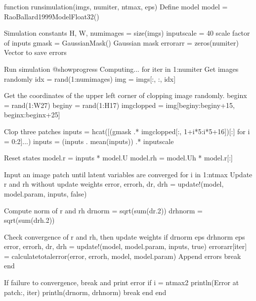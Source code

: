\documentclass[letterpaper,10pt,english]{sphinxmanual}
\begin{document}
\begin{sphinxVerbatim}[commandchars=\\\{\}]
function run\PYGZus{}simulation(imgs, num\PYGZus{}iter, nt\PYGZus{}max, eps)
    \PYGZsh{} Define model
    model = RaoBallard1999Model\PYGZob{}Float32\PYGZcb{}()
    
    \PYGZsh{} Simulation constants
    H, W, num\PYGZus{}images = size(imgs)
    input\PYGZus{}scale = 40 \PYGZsh{} scale factor of inputs
    gmask = GaussianMask() \PYGZsh{} Gaussian mask
    errorarr = zeros(num\PYGZus{}iter) \PYGZsh{} Vector to save errors    
    
    \PYGZsh{} Run simulation
    @showprogress \PYGZdq{}Computing...\PYGZdq{} for iter in 1:num\PYGZus{}iter
        \PYGZsh{} Get images randomly
        idx = rand(1:num\PYGZus{}images)
        img = imgs[:, :, idx]

        \PYGZsh{} Get the coordinates of the upper left corner of clopping image randomly.
        beginx = rand(1:W\PYGZhy{}27)
        beginy = rand(1:H\PYGZhy{}17)
        img\PYGZus{}clopped = img[beginy:beginy+15, beginx:beginx+25]

        \PYGZsh{} Clop three patches
        inputs = hcat([(gmask .* img\PYGZus{}clopped[:, 1+i*5:i*5+16])[:] for i = 0:2]...)\PYGZsq{}
        inputs = (inputs .\PYGZhy{} mean(inputs)) .* input\PYGZus{}scale

        \PYGZsh{} Reset states
        model.r = inputs * model.U 
        model.rh = model.Uh\PYGZsq{} * model.r[:]

        \PYGZsh{} Input an image patch until latent variables are converged 
        for i in 1:nt\PYGZus{}max
            \PYGZsh{} Update r and rh without update weights 
            error, errorh, dr, drh = update!(model, model.param, inputs, false)

            \PYGZsh{} Compute norm of r and rh
            dr\PYGZus{}norm = sqrt(sum(dr.\PYGZca{}2))
            drh\PYGZus{}norm = sqrt(sum(drh.\PYGZca{}2))

            \PYGZsh{} Check convergence of r and rh, then update weights
            if dr\PYGZus{}norm \PYGZlt{} eps \PYGZam{}\PYGZam{} drh\PYGZus{}norm \PYGZlt{} eps
                error, errorh, dr, drh = update!(model, model.param, inputs, true)
                errorarr[iter] = calculate\PYGZus{}total\PYGZus{}error(error, errorh, model, model.param) \PYGZsh{} Append errors
                break
            end

            \PYGZsh{} If failure to convergence, break and print error
            if i \PYGZgt{}= nt\PYGZus{}max\PYGZhy{}2
                println(\PYGZdq{}Error at patch:\PYGZdq{}, iter)
                println(dr\PYGZus{}norm, drh\PYGZus{}norm)
                break
            end
        end



\end{sphinxVerbatim}
\end{document}
